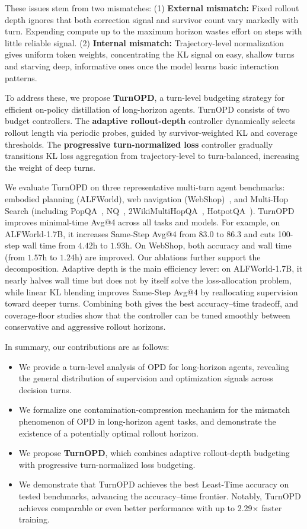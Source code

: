 These issues stem from two mismatches: (1) \textbf{External mismatch:} Fixed rollout depth ignores that both correction signal and survivor count vary markedly with turn. Expending compute up to the maximum horizon wastes effort on steps with little reliable signal. (2) \textbf{Internal mismatch:} Trajectory-level normalization gives uniform token weights, concentrating the KL signal on easy, shallow turns and starving deep, informative ones once the model learns basic interaction patterns.

To address these, we propose \textbf{TurnOPD}, a turn-level budgeting strategy for efficient on-policy distillation of long-horizon agents. TurnOPD consists of two budget controllers. The \textbf{adaptive rollout-depth} controller dynamically selects rollout length via periodic probes, guided by survivor-weighted KL and coverage thresholds. The \textbf{progressive turn-normalized loss} controller gradually transitions KL loss aggregation from trajectory-level to turn-balanced, increasing the weight of deep turns.

We evaluate TurnOPD on three representative multi-turn agent benchmarks: embodied planning (ALFWorld), web navigation (WebShop)~\citep{yao2022webshop}, and Multi-Hop Search (including PopQA~\citep{mallen2023popqa}, NQ~\citep{kwiatkowski2019natural}, 2WikiMultiHopQA~\citep{ho2020twowiki}, HotpotQA~\citep{yang2018hotpotqa}). TurnOPD improves minimal-time Avg@4 across all tasks and models. For example, on ALFWorld-1.7B, it increases Same-Step Avg@4 from $83.0$ to $86.3$ and cuts 100-step wall time from $4.42$h to $1.93$h. On WebShop, both accuracy and wall time (from $1.57$h to $1.24$h) are improved.
Our ablations further support the decomposition. Adaptive depth is the main efficiency lever: on ALFWorld-1.7B, it nearly halves wall time but does not by itself solve the loss-allocation problem, while linear KL blending improves Same-Step Avg@4 by reallocating supervision toward deeper turns. Combining both gives the best accuracy--time tradeoff, and coverage-floor studies show that the controller can be tuned smoothly between conservative and aggressive rollout horizons.

In summary, our contributions are as follows:
\begin{itemize}[leftmargin=1.5em,itemsep=2pt,topsep=3pt]
\item We provide a turn-level analysis of OPD for long-horizon agents, revealing the general distribution of supervision and optimization signals across decision turns.
\item We formalize one contamination-compression mechanism for the mismatch phenomenon of OPD in long-horizon agent tasks, and demonstrate the existence of a potentially optimal rollout horizon.
\item We propose \textbf{TurnOPD}, which combines adaptive rollout-depth budgeting with progressive turn-normalized loss budgeting.
\item We demonstrate that TurnOPD achieves the best Least-Time accuracy on tested benchmarks, advancing the accuracy--time frontier. Notably, TurnOPD achieves comparable or even better performance with up to 2.29$\times$ faster training.
\end{itemize}
